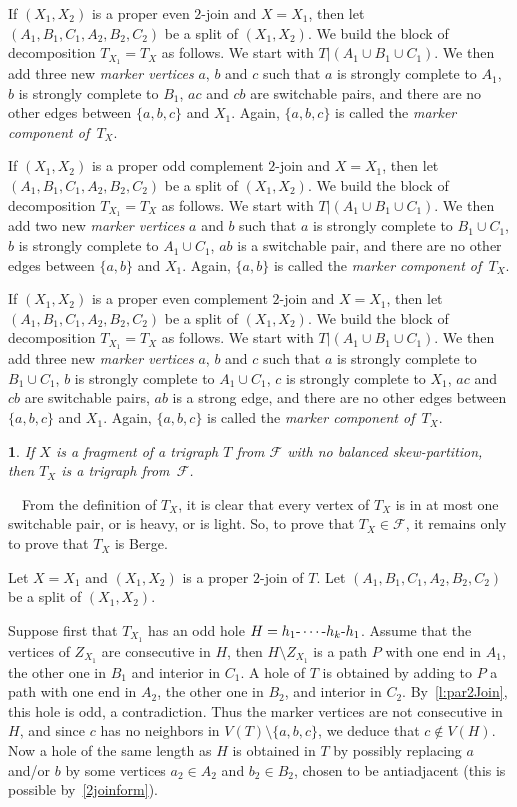 \documentclass[11 pt] {article}
\def\d{\hbox{-}}
\def\c{\hbox{-}\cdots\hbox{-}}
\newtheorem{theorem}{}[section]
\newcounter{claim}
\newcommand{\Proof}{\setcounter{claim}{0}\noindent{\bf Proof.}\ \ }
\begin{document}
If $(X_1,X_2)$ is a proper even $2$-join and $X=X_1$, then let
$(A_1,B_1,C_1,A_2,B_2,C_2)$ be a split of $(X_1, X_2)$. We build the
block of decomposition $T_{X_1}=T_X$ as follows. We start with $T |(
A_1\cup B_1\cup C_1)$. We then add three new \emph{marker vertices}
$a$, $b$ and $c$ such that $a$ is strongly complete to $A_1$, $b$ is
strongly complete to $B_1$, $ac$ and $cb$ are switchable pairs, and
there are no other edges between $\{a, b, c\}$ and $X_1$.  Again,
$\{a, b, c\}$ is called the \emph{marker component of~$T_X$}.


If $(X_1,X_2)$ is a proper odd complement $2$-join and $X=X_1$, then
let $(A_1,B_1,C_1,A_2,B_2,C_2)$ be a split of $(X_1, X_2)$. We build
the block of decomposition $T_{X_1}=T_X$ as follows. We start with $T
|( A_1\cup B_1\cup C_1)$. We then add two new \emph{marker vertices}
$a$ and $b$ such that $a$ is strongly complete to $B_1\cup C_1$, $b$
is strongly complete to $A_1\cup C_1$, $ab$ is a switchable pair, and
there are no other edges between $\{a, b\}$ and $X_1$.  Again, $\{a,
b\}$ is called the \emph{marker component of~$T_X$}.

If $(X_1,X_2)$ is a proper even complement $2$-join and $X=X_1$, then
let $(A_1,B_1,C_1,A_2,B_2,C_2)$ be a split of $(X_1, X_2)$. We build
the block of decomposition $T_{X_1}=T_X$ as follows. We start with $T
|( A_1\cup B_1\cup C_1)$. We then add three new \emph{marker vertices}
$a$, $b$ and $c$ such that $a$ is strongly complete to $B_1\cup C_1$,
$b$ is strongly complete to $A_1\cup C_1$, $c$ is strongly complete to
$X_1$, $ac$ and $cb$ are switchable pairs, $ab$ is a strong edge, and
there are no other edges between $\{a, b, c\}$ and $X_1$.  Again,
$\{a, b, c\}$ is called the \emph{marker component of~$T_X$}.


\begin{theorem}
 \label{l:stayBerge}
 If $X$ is a fragment of a trigraph $T$ from $\mathcal F$ with no
 balanced skew-partition, then $T_X$ is a trigraph from~$\mathcal F$.
\end{theorem}

\Proof From the definition of $T_X$, it is clear that every vertex of
$T_X$ is in at most one switchable pair, or is heavy, or is light.
So, to prove that $T_X \in {\mathcal F}$, it remains only to prove
that $T_X$ is Berge.

Let $X=X_1$ and $(X_1,X_2)$ is a proper $2$-join of $T$. Let
$(A_1,B_1,C_1,A_2,B_2,C_2)$ be a split of $(X_1,X_2)$. 

Suppose first that $T_{X_1}$ has an odd hole $H = h_1 \c h_k \d h_1$.
Assume that the vertices of $Z_{X_1}$ are consecutive in $H$,
then $H\setminus Z_{X_1}$ is a path $P$ with one end in $A_1$, the
other one in $B_1$ and interior in $C_1$. A hole of $T$ is obtained
by adding to $P$ a path with one end in $A_2$, the other one in $B_2$,
and interior in $C_2$. By~\ref{l:par2Join}, this hole is odd, a
contradiction. Thus the marker vertices are not consecutive in $H$,
and since $c$ has no neighbors in $V(T)\setminus\{a,b,c\}$, we deduce
that $c\not \in V(H)$. Now a hole of the same length as $H$ is obtained in
$T$ by possibly replacing $a$ and/or $b$ by some vertices $a_2 \in
A_2$ and $b_2\in B_2$, chosen to be antiadjacent (this is possible
by~\ref{2joinform}).
\end{document}
